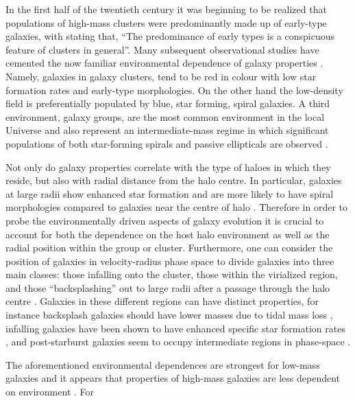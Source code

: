 \documentclass[a4paper,fleqn,usenatbib]{mnras}
\begin{document}
In the first half of the twentieth century it was beginning to be
realized that populations of high-mass clusters were predominantly
made up of early-type galaxies, with \citet{hubble1931} stating that,
``The predominance of early types is a conspicuous feature of clusters
in general''.  Many subsequent
observational studies have cemented the now
familiar environmental dependence of galaxy properties
\citep[e.g.][]{butcher1978, dressler1980, postman1984, dressler1999,
  blanton2005, wetzel2012}.  Namely, galaxies in galaxy clusters, tend
to be red in colour with low star formation
rates and early-type morphologies.  On the other hand the
low-density field is preferentially populated by blue, star
forming, spiral galaxies.  A third environment, galaxy groups, are the
most common environment in
the local Universe \citep{geller1983, eke2005} and also represent an
intermediate-mass regime in which significant populations of both
star-forming spirals and passive ellipticals are observed
\citep[e.g.][]{wilman2005, mcgee2011}.
\par
Not only do galaxy properties correlate with the type of haloes in
which they reside, but also with radial distance from the halo centre.
In particular, galaxies at large radii show enhanced star
formation and are more likely to have spiral morphologies compared to
galaxies near the centre of halo \citep{whitmore1993, goto2003,
  postman2005, rasmussen2012, wetzel2012, fasano2015, haines2015}.
Therefore in order to probe the environmentally driven aspects of
galaxy evolution it is crucial to account for both the dependence on
the host halo environment as well as the radial position within the
group or cluster.  Furthermore, one can consider the position
of galaxies in velocity-radius phase space to divide galaxies into
three main classes: those infalling onto the cluster, those within the
virialized region, and those
``backsplashing'' out to large radii after a passage through the halo
centre \citep[e.g.][]{mahajan2011}.  Galaxies in these different
regions can have distinct properties,
for instance backsplash galaxies should have lower masses due to tidal
mass loss \citep{gill2005}, infalling galaxies have been shown to have
enhanced specific star formation rates \citep{noble2016}, and
post-starburst galaxies seem to occupy intermediate regions in
phase-space \citep{muzzin2014}.
\par
The aforementioned environmental dependences are strongest for
low-mass galaxies and it appears that properties of high-mass galaxies
are less dependent on environment \citep{haines2006, bamford2009}.  For
\end{document}
